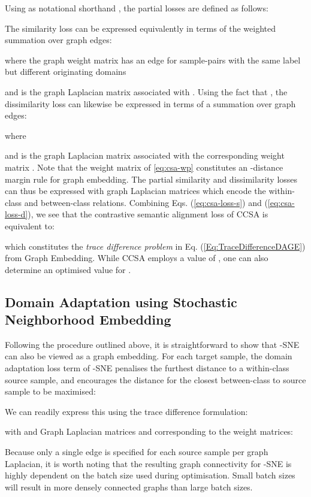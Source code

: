\documentclass[journal]{IEEEtran}
\begin{document}
Using as notational shorthand , the partial losses are defined as follows:

The similarity loss can be expressed equivalently in terms of the weighted summation over graph edges:

where the graph weight matrix  has an edge for sample-pairs with the same label but different originating domains

and  is the graph Laplacian matrix associated with .
Using the fact that , the dissimilarity loss can likewise be expressed in terms of a summation over graph edges:

where

and  is the graph Laplacian matrix associated with the corresponding weight matrix . Note that the weight matrix of \cref{eq:csa-wp} constitutes an -distance margin rule for graph embedding. 
The partial similarity and dissimilarity losses can thus be expressed with graph Laplacian matrices which encode the within-class and between-class relations. Combining Eqs. (\ref{eq:csa-loss-s}) and (\ref{eq:csa-loss-d}), we see that the contrastive semantic alignment loss of CCSA is equivalent to:

which constitutes the \textit{trace difference problem} in Eq. (\ref{Eq:TraceDifferenceDAGE}) from Graph Embedding. While CCSA employs a value of , one can also determine an optimised value for . 



\subsection{Domain Adaptation using Stochastic Neighborhood Embedding} \label{sec:dage-dsne}
Following the procedure outlined above, it is straightforward to show that -SNE~\cite{xu2019dsne} can also be viewed as a graph embedding.
For each target sample, the domain adaptation loss term of -SNE penalises the furthest distance to a within-class source sample, and encourages the distance for the closest between-class to source sample to be maximised:

We can readily express this using the trace difference formulation:

with  and  Graph Laplacian matrices  and  corresponding to the weight matrices:

Because only a single edge is specified for each source sample per graph Laplacian, it is worth noting that the resulting graph connectivity for -SNE is highly dependent on the batch size used during optimisation. Small batch sizes will result in more densely connected graphs than large batch sizes.
\end{document}
